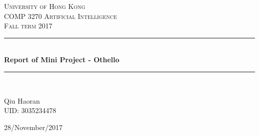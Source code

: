 \documentclass[letterpaper,12pt]{article}
\begin{document}
\begin{titlepage}
\newcommand{\HRule}{\rule{\linewidth}{0.5mm}} %

\center %

\textsc{\LARGE University of Hong Kong}\\[1.5cm] %
\vspace{2.5cm}
\textsc{\Large COMP 3270 Artificial Intelligence }\\[0.5cm] %
\textsc{\large Fall term 2017}\\[0.5cm] %


\HRule \\[0.4cm]
{ \LARGE \bfseries Report of Mini Project - Othello}\\[0.4cm] %
\HRule \\[1.5cm]
 

\begin{minipage}{0.8\textwidth}
\begin{center} \large
\vspace{0.5cm}

Qiu Haoran \\ \vspace{0.3cm}\textsc{UID: 3035234478}\\
\vspace{2cm}
\end{center}
\end{minipage}


{\large 28/November/2017}\\[3cm] %


\end{titlepage}
\end{document}
